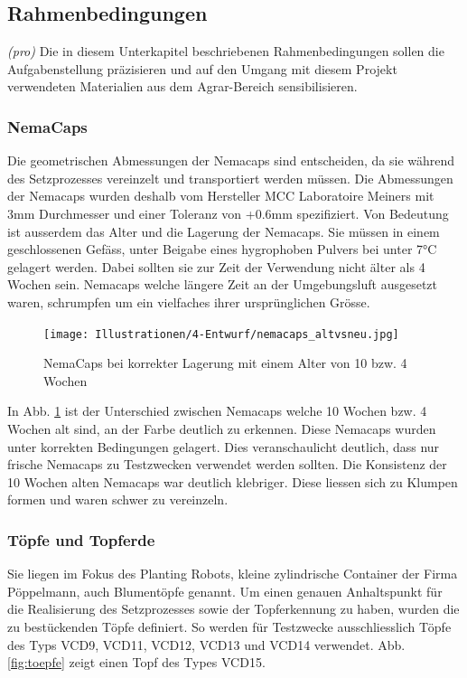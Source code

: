 \subsection{Rahmenbedingungen}
\textit{(pro)} Die in diesem Unterkapitel beschriebenen Rahmenbedingungen sollen die Aufgabenstellung präzisieren und auf den Umgang mit diesem Projekt verwendeten Materialien aus dem Agrar-Bereich sensibilisieren.

\subsubsection{NemaCaps}
Die geometrischen Abmessungen der Nemacaps sind entscheiden, da sie während des Setzprozesses vereinzelt und transportiert werden müssen. Die Abmessungen der Nemacaps wurden deshalb vom Hersteller MCC Laboratoire Meiners mit 3mm Durchmesser und einer Toleranz von +0.6mm spezifiziert. Von Bedeutung ist ausserdem das Alter und die Lagerung der Nemacaps. Sie müssen in einem geschlossenen Gefäss, unter Beigabe eines hygrophoben Pulvers bei unter 7°C gelagert werden. Dabei sollten sie zur Zeit der Verwendung nicht älter als 4 Wochen sein. Nemacaps welche längere Zeit an der Umgebungsluft ausgesetzt waren, schrumpfen um ein vielfaches ihrer ursprünglichen Grösse.

\begin{figure}[H]
	\texttt{[image: Illustrationen/4-Entwurf/nemacaps\_altvsneu.jpg]}
	\caption{NemaCaps bei korrekter Lagerung mit einem Alter von 10 bzw. 4 Wochen}
	\label{fig:nemacaps_altvsneu}
\end{figure}

In Abb. \ref{fig:nemacaps_altvsneu} ist der Unterschied zwischen Nemacaps welche 10 Wochen bzw. 4 Wochen alt sind, an der Farbe deutlich zu erkennen. Diese Nemacaps wurden unter korrekten Bedingungen gelagert. Dies veranschaulicht deutlich, dass nur frische Nemacaps zu Testzwecken verwendet werden sollten. Die Konsistenz der 10 Wochen alten Nemacaps war deutlich klebriger. Diese liessen sich zu Klumpen formen und waren schwer zu vereinzeln.

\subsubsection{Töpfe und Topferde}
Sie liegen im Fokus des Planting Robots, kleine zylindrische Container der Firma Pöppelmann, auch Blumentöpfe genannt. Um einen genauen Anhaltspunkt für die Realisierung des Setzprozesses sowie der Topferkennung zu haben, wurden die zu bestückenden Töpfe definiert. So werden für Testzwecke ausschliesslich Töpfe des Typs VCD9, VCD11, VCD12, VCD13 und VCD14 verwendet. Abb. \ref{fig:toepfe} zeigt einen Topf des Types VCD15.

